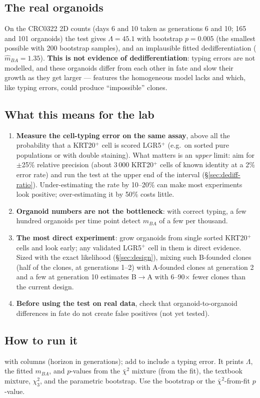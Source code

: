 \documentclass[10pt,a4paper]{article}
\newcommand{\BA}{B$\to$A}
\begin{document}
\subsection{The real organoids}
On the CRC0322 2D counts (days 6 and 10 taken as generations 6 and 10; 165 and 101 organoids) the test gives $\Lambda = 45.1$ with bootstrap $p = 0.005$ (the smallest possible with 200 bootstrap samples), and an implausible fitted dedifferentiation ($\hat m_{BA} = 1.35$). \textbf{This is not evidence of dedifferentiation}: typing errors are not modelled, and these organoids differ from each other in fate and slow their growth as they get larger --- features the homogeneous model lacks and which, like typing errors, could produce ``impossible'' clones.

\subsection{What this means for the lab}
\begin{enumerate}
\item \textbf{Measure the cell-typing error on the same assay}, above all the probability that a KRT20$^+$ cell is scored LGR5$^+$ (e.g.\ on sorted pure populations or with double staining). What matters is an \emph{upper} limit: aim for $\pm$25\% relative precision (about 3\,000 KRT20$^+$ cells of known identity at a 2\% error rate) and run the test at the upper end of the interval (\S\ref{sec:dediff-ratio}). Under-estimating the rate by 10--20\% can make most experiments look positive; over-estimating it by 50\% costs little.
\item \textbf{Organoid numbers are not the bottleneck}: with correct typing, a few hundred organoids per time point detect $m_{BA}$ of a few per thousand.
\item \textbf{The most direct experiment}: grow organoids from single sorted KRT20$^+$ cells and look early; any validated LGR5$^+$ cell in them is direct evidence. Sized with the exact likelihood (\S\ref{sec:design}), mixing such B-founded clones (half of the clones, at generations 1--2) with A-founded clones at generation 2 and a few at generation 10 estimates \BA{} with 6--90$\times$ fewer clones than the current design.
\item \textbf{Before using the test on real data}, check that organoid-to-organoid differences in fate do not create false positives (not yet tested).
\end{enumerate}

\subsection{How to run it}
 with columns  (horizon in generations); add  to include a typing error. It prints $\Lambda$, the fitted $m_{BA}$, and $p$-values from the $\bar\chi^2$ mixture (from the fit), the textbook mixture, $\chi^2_3$, and the parametric bootstrap. Use the bootstrap or the $\bar\chi^2$-from-fit $p$-value.
\end{document}

